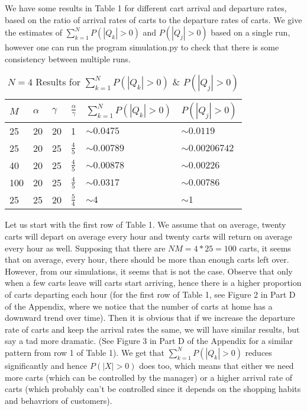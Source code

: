 \documentclass[english]{article}
\begin{document}
We have some results in Table 1 for different cart arrival and departure rates, based on the ratio of arrival rates of carts to the departure rates of carts. We give the estimates of $\sum_{k=1}^{N}P(|Q_k|>0)$ and $P(|Q_j|>0)$ based on a single run, however one can run the program simulation.py to check that there is some consistency between multiple runs. 

\begin{table}[h!]
\begin{center}
	\begin{tabular}{| l | l | l | l | l | l |}
	\hline
	$M$ & $\alpha$ & $\gamma$ & $\frac{\alpha}{\gamma}$ & $\sum_{k=1}^{N}P(|Q_k|>0)$ & $P(|Q_j|>0)$ \\ \hline
	25 & 20 & 20 & 1 & $\sim 0.0475$ & $\sim 0.0119$ \\ \hline
	25 & 20 & 25 & $\frac{4}{5}$ & $\sim 0.00789$ & $\sim 0.00206742$ \\ \hline
	40 & 20 & 25 & $\frac{4}{5}$ & $\sim 0.00878$ & $\sim 0.00226$ \\ \hline
	100 & 20 & 25 & $\frac{4}{5}$ & $\sim 0.0317$ & $\sim 0.00786$ \\ \hline
	25 & 25 & 20 & $\frac{5}{4}$ & $\sim 4$ & $\sim1$ \\
	\hline
	\end{tabular}
\end{center}
\caption{$N = 4$ Results for $\sum_{k=1}^{N}P(|Q_k|>0)$ \& $P(|Q_j|>0)$ }
\end{table}
Let us start with the first row of Table 1. We assume that on average, twenty carts will depart on average every hour and twenty carts will return on average every hour as well. Supposing that there are $NM=4*25=100$ carts, it seems that on average, every hour, there should be more than enough carts left over. However, from our simulations, it seems that is not the case. Observe that only when a few carts leave will carts start arriving, hence there is a higher proportion of carts departing each hour (for the first row of Table 1, see Figure 2 in Part D of the Appendix, where we notice that the number of carts at home has a downward trend over time). Then it is obvious that if we increase the departure rate of carts and keep the arrival rates the same, we will have similar results, but say a tad more dramatic. (See Figure 3 in Part D of the Appendix for a similar pattern from row 1 of Table 1). We get that $\sum_ {k=1}^{N}P(|Q_k|>0)$ reduces significantly and hence $P(|X|>0)$ does too, which means that either we need more carts (which can be controlled by the manager) or a higher arrival rate of carts (which probably can't be controlled since it depends on the shopping habits and behavriors of customers). 
\end{document}
